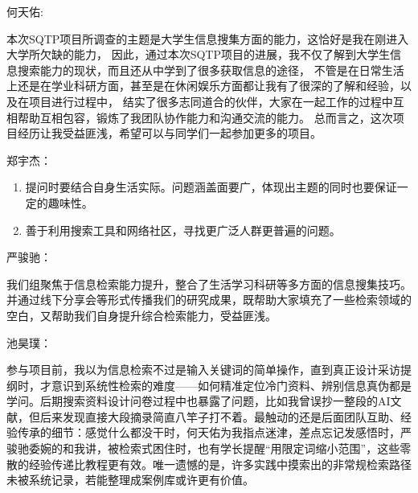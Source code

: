 何天佑:
\begin{notebox}
  本次SQTP项目所调查的主题是大学生信息搜集方面的能力，这恰好是我在刚进入大学所欠缺的能力，
  因此，通过本次SQTP项目的进展，我不仅了解到大学生信息搜索能力的现状，而且还从中学到了很多获取信息的途径，
  不管是在日常生活上还是在学业科研方面，甚至是在休闲娱乐方面都让我有了很深的了解和经验，以及在项目进行过程中，
  结实了很多志同道合的伙伴，大家在一起工作的过程中互相帮助互相包容，锻炼了我团队协作能力和沟通交流的能力。
  总而言之，这次项目经历让我受益匪浅，希望可以与同学们一起参加更多的项目。
\end{notebox}
郑宇杰：
\begin{notebox}
  \begin{enumerate}
    \item 提问时要结合自身生活实际。问题涵盖面要广，体现出主题的同时也要保证一定的趣味性。
    \item 善于利用搜索工具和网络社区，寻找更广泛人群更普遍的问题。
  \end{enumerate}
\end{notebox}
严骏驰：
\begin{notebox}
  我们组聚焦于信息检索能力提升，整合了生活学习科研等多方面的信息搜集技巧。
  并通过线下分享会等形式传播我们的研究成果，既帮助大家填充了一些检索领域的空白，又帮助我们自身提升综合检索能力，受益匪浅。
\end{notebox}
池昊璞：
\begin{notebox}
  参与项目前，我以为信息检索不过是输入关键词的简单操作，直到真正设计采访提纲时，才意识到系统性检索的难度——如何精准定位冷门资料、辨别信息真伪都是学问。后期搜索资料设计问卷过程中也暴露了问题，比如我曾误抄一整段的AI文献，但后来发现直接大段摘录简直八竿子打不着。最触动的还是后面团队互助、经验传承的细节：感觉什么都没干时，何天佑为我指点迷津，差点忘记发感悟时，严骏驰委婉的和我讲，被检索式困住时，也有学长提醒“用限定词缩小范围”，这些零散的经验传递比教程更有效。唯一遗憾的是，许多实践中摸索出的非常规检索路径未被系统记录，若能整理成案例库或许更有价值。
\end{notebox}